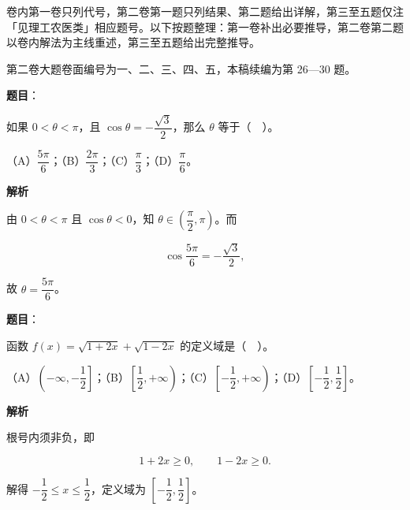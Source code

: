 

卷内第一卷只列代号，第二卷第一题只列结果、第二题给出详解，第三至五题仅注「见理工农医类」相应题号。以下按题整理：第一卷补出必要推导，第二卷第二题以卷内解法为主线重述，第三至五题给出完整推导。

第二卷大题卷面编号为一、二、三、四、五，本稿续编为第 26—30 题。


\begin{answer}

\textbf{题目}：

如果 $0<\theta<\pi$，且 $\cos\theta=-\dfrac{\sqrt3}{2}$，那么 $\theta$ 等于（　）。

（A）$\dfrac{5\pi}{6}$；（B）$\dfrac{2\pi}{3}$；（C）$\dfrac{\pi}{3}$；（D）$\dfrac{\pi}{6}$。

\textbf{解析}

由 $0<\theta<\pi$ 且 $\cos\theta<0$，知 $\theta\in\left(\dfrac{\pi}{2},\pi\right)$。而

\nopagebreak[4]
\[
\cos\frac{5\pi}{6}=-\frac{\sqrt3}{2},
\]

故 $\theta=\dfrac{5\pi}{6}$。


\end{answer}
\begin{answer}

\textbf{题目}：

函数 $f(x)=\sqrt{1+2x}+\sqrt{1-2x}$ 的定义域是（　）。

（A）$\left(-\infty,-\dfrac12\right]$；（B）$\left[\dfrac12,+\infty\right)$；（C）$\left[-\dfrac12,+\infty\right)$；（D）$\left[-\dfrac12,\dfrac12\right]$。

\textbf{解析}

根号内须非负，即

\nopagebreak[4]
\[
1+2x\ge 0,\qquad 1-2x\ge 0.
\]

解得 $-\dfrac12\le x\le\dfrac12$，定义域为 $\left[-\dfrac12,\dfrac12\right]$。


\end{answer}
